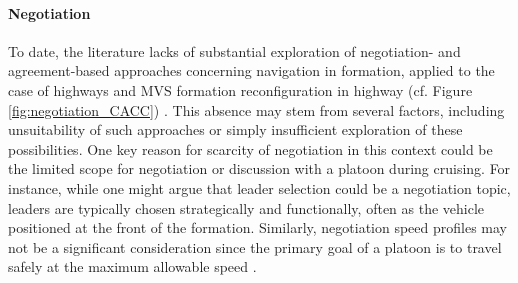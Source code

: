 \paragraph{Negotiation} \label{sec: Negotiation_platoon}

To date, the literature lacks of substantial exploration of negotiation- and agreement-based approaches concerning navigation in formation, applied to the case of highways and MVS formation reconfiguration in highway (cf. Figure \ref{fig:negotiation_CACC}) \cite{mariani2021coordination}. This absence may stem from several factors, including unsuitability of such approaches or simply insufficient exploration of these possibilities. One key reason for scarcity of negotiation in this context could be the limited scope for negotiation or discussion with a platoon during cruising. For instance, while one might argue that leader selection could be a negotiation topic, leaders are typically chosen strategically and functionally, often as the vehicle positioned at the front of the formation. Similarly, negotiation speed profiles may not be a significant consideration since the primary goal of a platoon is to travel safely at the maximum allowable speed \cite{mariani2021coordination}. 
